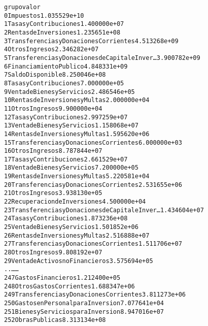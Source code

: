 \documentclass[letterpaper,10pt,english]{/usr/local/lib/python2.7/dist-packages/sphinx/texinputs/sphinxhowto}
\newenvironment{InvisibleVerbatim}
        {\begin{mdframed}[leftmargin=0.1\linewidth,innerleftmargin=3pt,innerrightmargin=3pt, userdefinedwidth=1\linewidth, linewidth=0pt, linecolor=white, usetwoside=false]}
        {\end{mdframed}}
\begin{document}
\begin{InvisibleVerbatim}
\begin{alltt}
                                                 grupo         valor
0                                            Impuestos  1.035529e+10
1                              Tasas y Contribuciones   1.400000e+07
2                               Rentas de Inversiones   1.235651e+08
3               Transferencias y Donaciones Corrientes  4.513268e+09
4                                       Otros Ingresos  2.346282e+07
5    Transferencias y Donaciones de Capital e Inver\ldots  3.900782e+09
6                               Financiamiento Publico  4.848331e+09
7                                     Saldo Disponible  8.250046e+08
8                              Tasas y Contribuciones   7.000000e+05
9                          Venta de Bienes y Servicios  2.486546e+05
10                     Rentas de Inversiones y Multas   2.000000e+04
11                                      Otros Ingresos  9.900000e+04
12                             Tasas y Contribuciones   2.997259e+07
13                         Venta de Bienes y Servicios  1.158068e+07
14                     Rentas de Inversiones y Multas   1.595620e+06
15              Transferencias y Donaciones Corrientes  6.000000e+03
16                                      Otros Ingresos  8.787844e+07
17                             Tasas y Contribuciones   2.661529e+07
18                         Venta de Bienes y Servicios  7.200000e+05
19                     Rentas de Inversiones y Multas   5.220581e+04
20              Transferencias y Donaciones Corrientes  2.531655e+06
21                                      Otros Ingresos  3.938130e+05
22                         Recuperacion de Inversiones  4.500000e+04
23   Transferencias y Donaciones de Capital e Inver\ldots  1.434604e+07
24                             Tasas y Contribuciones   1.873236e+08
25                         Venta de Bienes y Servicios  1.501852e+06
26                     Rentas de Inversiones y Multas   2.516888e+07
27              Transferencias y Donaciones Corrientes  1.511706e+07
28                                      Otros Ingresos  9.808192e+07
29                    Venta de Activos no Financieros   3.575694e+05
..                                                 \ldots           \ldots
247                                 Gastos Financieros  1.212400e+05
248                            Otros Gastos Corrientes  1.688347e+06
249             Transferencias y Donaciones Corrientes  3.811273e+06
250                  Gastos en Personal para Inversion  7.077641e+04
251                  Bienes y Servicios para Inversion  8.947016e+07
252                                     Obras Publicas  8.313134e+08

\end{alltt}
\end{InvisibleVerbatim}
\end{document}
